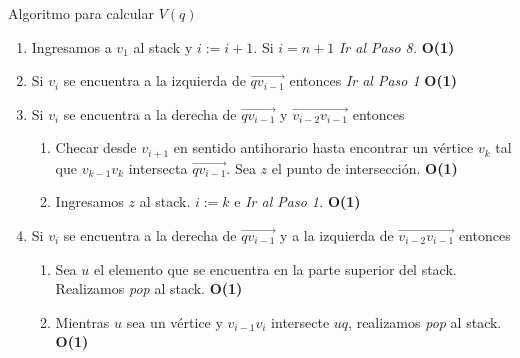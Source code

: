 \documentclass[aspectratio=169,xcolor=dvipsnames, t]{beamer}
\begin{document}
\begin{frame}{Algoritmo para calcular $V(q)$}
    \begin{enumerate}
            \item Ingresamos a $v_{1}$ al stack y $i := i + 1$. Si $i = n + 1$ \textit{Ir al Paso 8.} \textbf{O(1)}
            \item Si $v_{i}$ se encuentra a la izquierda de $\overrightarrow{qv_{i-1}}$ entonces \textit{Ir al Paso 1} \textbf{O(1)}
            \item Si $v_{i}$ se encuentra a la derecha de $\overrightarrow{qv_{i-1}}$ y $\overrightarrow{v_{i-2}v_{i-1}}$ entonces
                \begin{enumerate}
                    \item Checar desde $v_{i+1}$ en sentido antihorario hasta encontrar un vértice $v_{k}$ tal que $v_{k-1}v_{k}$ intersecta $\overrightarrow{qv_{i-1}}$. Sea $z$ el punto de intersección. \textbf{O(1)}
                    \item Ingresamos $z$ al stack. $i := k$ e \textit{Ir al Paso 1.} \textbf{O(1)}
                \end{enumerate}
            \item Si $v_{i}$ se encuentra a la derecha de $\overrightarrow{qv_{i-1}}$ y a la izquierda de $\overrightarrow{v_{i-2}v_{i-1}}$ entonces
                \begin{enumerate}
                    \item Sea $u$ el elemento que se encuentra en la parte superior del stack. Realizamos \textit{pop} al stack. \textbf{O(1)}
                    \item Mientras $u$ sea un vértice y $v_{i-1}v_{i}$ intersecte $uq$, realizamos \textit{pop} al stack. \textbf{O(1)}
                \end{enumerate}
    \end{enumerate}
\end{frame}
\end{document}
